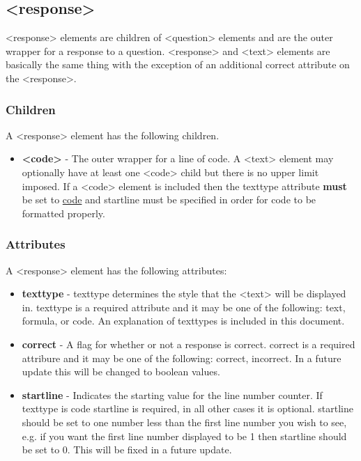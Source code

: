 \documentclass{article}
\begin{document}
	\subsection{{\textless}response{\textgreater}}
	{\textless}response{\textgreater} elements are children of {\textless}question{\textgreater} elements and are the outer wrapper for a response to a question. {\textless}response{\textgreater} and {\textless}text{\textgreater} elements are basically the same thing with the exception of an additional correct attribute on the {\textless}response{\textgreater}.
	\subsubsection{Children}
	A {\textless}response{\textgreater} element has the following children.
	\begin{itemize}
		\item \textbf{{\textless}code{\textgreater}} - The outer wrapper for a line of code. A {\textless}text{\textgreater} element may optionally have at least one {\textless}code{\textgreater} child but there is no upper limit imposed. If a {\textless}code{\textgreater} element is included then the texttype attribute \textbf{must} be set to \underline{code} and startline must be specified in order for code to be formatted properly.
	\end{itemize}
	\subsubsection{Attributes}
	A {\textless}response{\textgreater} element has the following attributes:
	\begin{itemize}
		\item \textbf{texttype} - texttype determines the style that the {\textless}text{\textgreater} will be displayed in. texttype is a required attribute and it may be one of the following: text, formula, or code. An explanation of texttypes is included in this document.
		\item \textbf{correct} - A flag for whether or not a response is correct. correct is a required attribure and it may be one of the following: correct, incorrect. In a future update this will be changed to boolean values. 
		\item \textbf{startline} - Indicates the starting value for the line number counter. If texttype is code startline is required, in all other cases it is optional. startline should be set to one number less than the first line number you wish to see, e.g. if you want the first line number displayed to be 1 then startline should be set to 0. This will be fixed in a future update. 
	\end{itemize}
	
\end{document}
